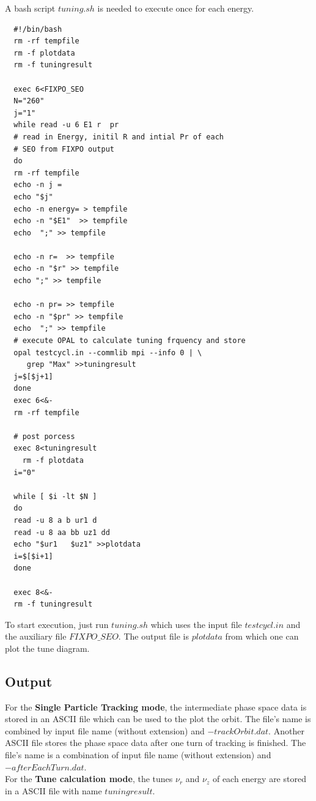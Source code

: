 A bash script $tuning.sh$ is needed to execute \opalcycl once for each energy. 
\begin{fmpage}
\begin{footnotesize}
\begin{verbatim}
  #!/bin/bash
  rm -rf tempfile
  rm -f plotdata
  rm -f tuningresult

  exec 6<FIXPO_SEO
  N="260"
  j="1"
  while read -u 6 E1 r  pr
  # read in Energy, initil R and intial Pr of each 
  # SEO from FIXPO output
  do
  rm -rf tempfile
  echo -n j =
  echo "$j"
  echo -n energy= > tempfile
  echo -n "$E1"  >> tempfile
  echo  ";" >> tempfile

  echo -n r=  >> tempfile
  echo -n "$r" >> tempfile
  echo ";" >> tempfile

  echo -n pr= >> tempfile
  echo -n "$pr" >> tempfile
  echo  ";" >> tempfile
  # execute OPAL to calculate tuning frquency and store
  opal testcycl.in --commlib mpi --info 0 | \
     grep "Max" >>tuningresult
  j=$[$j+1]
  done
  exec 6<&-
  rm -rf tempfile

  # post porcess
  exec 8<tuningresult
    rm -f plotdata
  i="0"

  while [ $i -lt $N ]
  do
  read -u 8 a b ur1 d
  read -u 8 aa bb uz1 dd
  echo "$ur1   $uz1" >>plotdata
  i=$[$i+1]
  done

  exec 8<&-
  rm -f tuningresult
\end{verbatim}
\end{footnotesize}
\end{fmpage}
To start execution, just run $tuning.sh$ which uses the input file $testcycl.in$ and the auxiliary file {\footnotesize$FIXPO\_SEO$}.
The output file is $plotdata$ from which one can plot the tune diagram.

\subsection{Output}  
For the {\bfseries Single Particle Tracking mode}, the intermediate phase space data is stored in an ASCII file which can be used to
the plot the orbit. The file's name is combined by input file name (without extension) and $-trackOrbit.dat$.
Another ASCII file stores the phase space data after one turn of tracking is finished. The file's name is a combination of input file name 
(without extension) and $-afterEachTurn.dat$.\\
 
For the {\bfseries Tune calculation mode}, the tunes $\nu_r$ and $\nu_z$ of each energy are stored in a ASCII file with name 
$tuningresult$.\\

